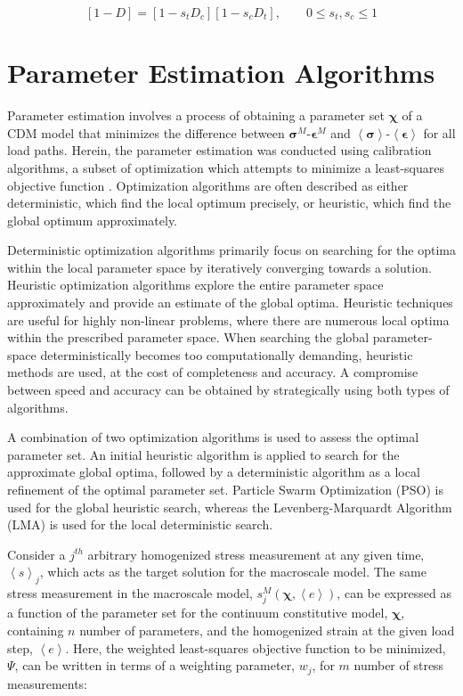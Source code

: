 \begin{equation}
\left[1-D\right]=\left[1-s_{t}D_{c}\right]\left[1-s_{c}D_{t}\right],\qquad0\leq s_{t},s_{c}\leq1\label{eqn:dam4}
\end{equation}

\section{Parameter Estimation Algorithms}
Parameter estimation involves a process of obtaining a parameter set $\boldsymbol{\chi}$ of a CDM model that minimizes the difference between $\boldsymbol{\sigma}^M$-$\boldsymbol{\epsilon}^M$ and $\left<\boldsymbol{\sigma}\right>$-$\left<\boldsymbol{\epsilon}\right>$ for all load paths. Herein, the parameter estimation was conducted using calibration algorithms, a subset of optimization which attempts to minimize a least-squares objective function \citep{matott_ostrich:_2008}. Optimization algorithms are often described as either deterministic, which find the local optimum precisely, or heuristic, which find the global optimum approximately.

Deterministic optimization algorithms primarily focus on searching for the optima within the local parameter space by iteratively converging towards a solution. Heuristic optimization algorithms explore the entire parameter space approximately and provide an estimate of the global optima. Heuristic techniques are useful for highly non-linear problems, where there are numerous local optima within the prescribed parameter space. When searching the global parameter-space deterministically becomes too computationally demanding, heuristic methods are used, at the cost of completeness and accuracy. A compromise between speed and accuracy can be obtained by strategically using both types of algorithms.

A combination of two optimization algorithms is used to assess the optimal parameter set. An initial heuristic algorithm is applied to search for the approximate global optima, followed by a deterministic algorithm as a local refinement of the optimal parameter set. Particle Swarm Optimization (PSO) is used for the global heuristic search, whereas the Levenberg-Marquardt Algorithm (LMA) is used for the local deterministic search. 

Consider a $j^{th}$ arbitrary homogenized stress measurement at any given time, $\left< s \right>_j$, which acts as the target solution for the macroscale model. The same stress measurement in the macroscale model, $s^M_j \left(\boldsymbol{\chi}, \left< e \right>\right)$, can be expressed as a function of the parameter set for the continuum constitutive model, $\boldsymbol{\chi}$, containing $n$ number of parameters, and the homogenized strain at the given load step, $\left< e \right>$. Here, the weighted least-squares objective function to be minimized, $\Psi$, can be written in terms of a weighting parameter, $w_j$, for $m$ number of stress measurements:

